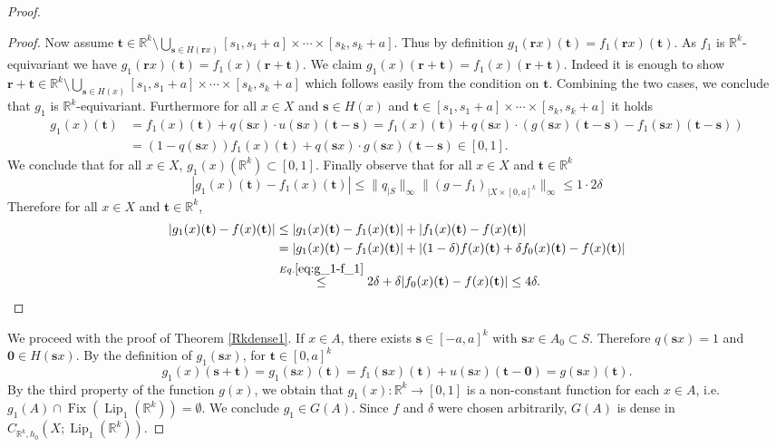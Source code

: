 \documentclass[11pt]{article}
\theoremstyle{plain}
\theoremstyle{definition}
\DeclareMathOperator{\Lip}{Lip}
\DeclareMathOperator{\Fix}{Fix}
\def\R{\mathbb{R}}
\def\Rk{\mathbb{R}^k}
\def\tt{\mathbf t}
\def\ss{\mathbf s}
\def\rr{\mathbf r}
\numberwithin{figure}{section}
\begin{document}
\begin{proof}
\begin{proof}
    Now assume $\tt\in\Rk\setminus\bigcup\limits_{\mathbf s\in H(\rr x)}[s_1,s_1+a]\times \cdots \times [s_k,s_k+a]$. Thus by definition $g_1(\rr x)(\tt)=f_1(\rr x)(\tt)$. As $f_1$ is $\Rk$-equivariant we have  $g_1(\rr x)(\tt)=f_1(x)(\rr+\tt)$. We claim $g_1(x)(\rr+\tt)=f_1(x)(\rr+\tt)$. Indeed it is enough to show $\rr+\tt\in \Rk\setminus\bigcup\limits_{\mathbf s\in H( x)}[s_1,s_1+a]\times \cdots \times [s_k,s_k+a]$ which follows easily from the condition on $\tt$.  Combining the two cases, we conclude that $g_1$ is $\Rk$-equivariant. Furthermore for all $x\in X$ and $\ss\in H(x)$ and $\tt\in[s_1,s_1+a]\times \cdots \times [s_k,s_k+a]$ it holds
   \begin{equation}
        \begin{split}
    g_1(x)(\tt)&=f_1(x)(\tt)+q(\ss x)\cdot u(\ss x)(\mathbf {t-s})=f_1(x)(\tt)+q(\ss x)\cdot (g(\ss x)(\mathbf {t-s})-f_1(\ss x)(\mathbf {t-s}))\\
    &=(1-q(\ss x))f_1(x)(\tt)+q(\ss x)\cdot g(\ss x)(\mathbf {t-s})\in [0,1].
    \end{split}
     \end{equation}
     We conclude that for all $x\in X$, $g_1(x)(\R^k)\subset [0,1]$.
          Finally observe that for all $x\in X$ and $\tt\in\Rk$
    \begin{equation}\label{eq:g_1-f_1}
        |g_1(x)(\tt)-f_1(x)(\tt)|\leq \|q_{|S}\|_{\infty} \|(g-f_1)_{|X\times [0,a]^k}\|_{\infty}\leq 1\cdot 2\delta
    \end{equation}
      Therefore for all $x\in X$ and $\mathbf t\in\Rk$,
    \begin{equation}\label{eq:g_1-f}
        \begin{split}
            |g_1(x)(\tt)-f(x)(\tt)|&\leq |g_1(x)(\tt)-f_1(x)(\tt)|+|f_1(x)(\tt)-f(x)(\tt)|\\
            &=|g_1(x)(\tt)-f_1(x)(\tt)|+|(1-\delta)f(x)(\tt)+\delta f_0(x)(\tt)-f(x)(\tt)|\\
            &\stackrel{Eq. \eqref{eq:g_1-f_1}}{\leq}2\delta+\delta|f_0(x)(\tt)-f(x)(\tt)|\leq 4\delta.
        \end{split}
    \end{equation}
    \end{proof}
    We proceed with the proof of Theorem \ref{Rkdense1}. If $x\in A$, there exists $\mathbf s\in[-a,a]^k$ with $\ss x\in A_0\subset S$. Therefore $q(\ss x)=1$ and $\mathbf 0\in H(\ss x)$. By the definition of $g_1(\ss x)$, for $\mathbf t\in[0,a]^k$
    \begin{equation*}\label{g1=g}
        g_1(x)(\mathbf {s+t})=g_1(\ss x)(\tt)=f_1(\ss x)(\tt)+u(\ss x)(\mathbf {t-0})=g(\ss x)(\tt).
    \end{equation*}
    By the third property of the function $g(x)$, we obtain that $g_1(x):\Rk\to[0,1]$ is a non-constant function for each $x\in A$, i.e. $g_1(A)\cap\Fix(\Lip_{1}(\Rk))=\emptyset$. We conclude $g_1\in G(A)$. Since $f$ and $\delta$ were chosen arbitrarily, $G(A)$ is dense in $C_{\Rk,h_0}(X;\Lip_{1}(\Rk))$.
\end{proof}
\end{document}
